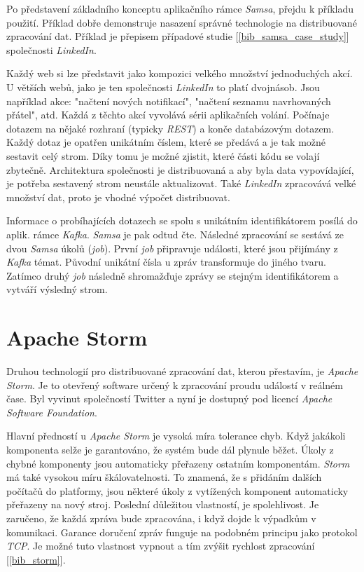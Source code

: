 \documentclass[
  digital, %
  table,   %
  nolof,     %
  nolot,     %
  oneside, %
  nocover,
  monochrome,
  12pt
]{fithesis3}
\begin{document}
Po představení základního konceptu aplikačního rámce \textit{Samsa}, přejdu k příkladu použití. Příklad dobře demonstruje nasazení správné technologie na distribuované zpracování dat. Příklad je přepisem případové studie [\ref{bib_samsa_case_study}] společnosti \textit{LinkedIn}.

Každý web si lze představit jako kompozici velkého množství jednoduchých akcí. U větších webů, jako je ten společnosti \textit{LinkedIn} to platí dvojnásob. Jsou například akce: "načtení nových notifikací", "načtení seznamu navrhovaných přátel", atd. Každá z těchto akcí vyvolává sérii aplikačních volání. Počínaje dotazem na nějaké rozhraní (typicky \textit{REST}) a konče databázovým dotazem. Každý dotaz je opatřen unikátním číslem, které se předává a je tak možné sestavit celý strom. Díky tomu je možné zjistit, které části kódu se volají zbytečně. Architektura společnosti je distribuovaná a aby byla data vypovídající, je potřeba sestavený strom neustále aktualizovat. Také \textit{LinkedIn} zpracovává velké množství dat, proto je vhodné výpočet distribuovat.

Informace o probíhajících dotazech se spolu s unikátním identifikátorem posílá do aplik. rámce \textit{Kafka}. \textit{Samsa} je pak odtud čte. Následné zpracování se sestává ze dvou \textit{Samsa} úkolů (\textit{job}). První \textit{job} připravuje události, které jsou přijímány z \textit{Kafka} témat. Původní unikátní čísla u zpráv transformuje do jiného tvaru. Zatímco druhý \textit{job} následně shromažďuje zprávy se stejným identifikátorem a vytváří výsledný strom.

\section{Apache Storm}
Druhou technologií pro distribuované zpracování dat, kterou přestavím, je \textit{Apache Storm}. Je to otevřený software určený k zpracování proudu událostí v reálném čase. Byl vyvinut společností Twitter a nyní je dostupný pod licencí \textit{Apache Software Foundation}.

Hlavní předností u \textit{Apache Storm} je vysoká míra tolerance chyb. Když jakákoli komponenta selže je garantováno, že systém bude dál plynule běžet. Úkoly z chybné komponenty jsou automaticky přeřazeny ostatním komponentám. \textit{Storm} má také vysokou míru škálovatelnosti. To znamená, že s přidáním dalších počítačů do platformy, jsou některé úkoly z vytížených komponent automaticky přeřazeny na nový stroj. Poslední důležitou vlastností, je spolehlivost. Je zaručeno, že každá zpráva bude zpracována, i když dojde k výpadkům v komunikaci. Garance doručení zpráv funguje na podobném principu jako protokol \textit{TCP}. Je možné tuto vlastnost vypnout a tím zvýšit rychlost zpracování [\ref{bib_storm}].
\end{document}
